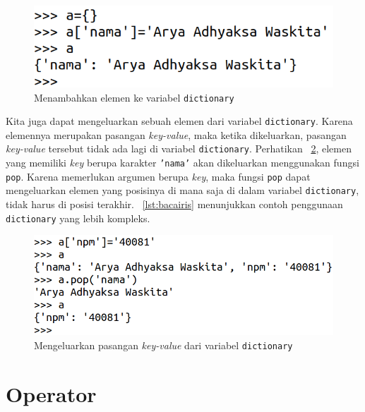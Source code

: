 \begin{figure}[h!]
  \begin{center}
    \includegraphics[scale=1.25]{pics/dictionary.png}
    \caption{Menambahkan elemen ke variabel \texttt{dictionary}}
    \label{fig:dict}
  \end{center}
\end{figure}

Kita juga dapat mengeluarkan sebuah elemen dari variabel \texttt{dictionary}. Karena elemennya merupakan pasangan \textit{key-value}, maka ketika dikeluarkan, pasangan \textit{key-value} tersebut tidak ada lagi di variabel \texttt{dictionary}. Perhatikan \figurename~\ref{fig:popDict}, elemen yang memiliki \textit{key} berupa karakter \texttt{'nama'} akan dikeluarkan menggunakan fungsi \texttt{pop}. Karena memerlukan argumen berupa \textit{key}, maka fungsi \texttt{pop} dapat mengeluarkan elemen yang posisinya di mana saja di dalam variabel \texttt{dictionary}, tidak harus di posisi terakhir. \lstlistingname~\ref{lst:bacairis} menunjukkan contoh penggunaan \texttt{dictionary} yang lebih kompleks. 

\begin{figure}
  \begin{center}
    \includegraphics[scale=1.25]{pics/popDict.png}
    \caption{Mengeluarkan pasangan \textit{key-value} dari variabel \texttt{dictionary}}
    \label{fig:popDict}
  \end{center}
\end{figure}

\section{Operator}
